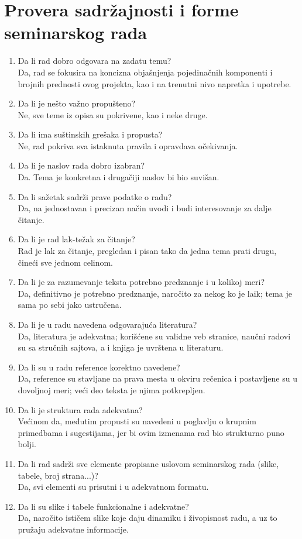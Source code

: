 \documentclass[a4paper]{report}
\begin{document}
	\section{Provera sadržajnosti i forme seminarskog rada}
	
	\begin{enumerate}
		\item Da li rad dobro odgovara na zadatu temu?\\
		Da, rad se fokusira na koncizna objašnjenja pojedinačnih komponenti i brojnih prednosti ovog projekta, kao i na trenutni nivo napretka i upotrebe.
		\item Da li je nešto važno propušteno?\\
		Ne, sve teme iz opisa su pokrivene, kao i neke druge.
		\item Da li ima suštinskih grešaka i propusta?\\
		Ne, rad pokriva sva istaknuta pravila i opravdava očekivanja.
		\item Da li je naslov rada dobro izabran?\\
		Da. Tema je konkretna i drugačiji naslov bi bio suvišan.
		\item Da li sažetak sadrži prave podatke o radu?\\
		Da, na jednostavan i precizan način uvodi i budi interesovanje za dalje čitanje.
		\item Da li je rad lak-težak za čitanje?\\
		Rad je lak za čitanje, pregledan i pisan tako da jedna tema prati drugu, čineći sve jednom celinom. 
		\item Da li je za razumevanje teksta potrebno predznanje i u kolikoj meri?\\
		Da, definitivno je potrebno predznanje, naročito za nekog ko je laik; tema je sama po sebi jako ustručena.
		\item Da li je u radu navedena odgovarajuća literatura?\\
		Da, literatura je adekvatna; korišćene su validne veb stranice, naučni radovi su sa stručnih sajtova, a i knjiga je uvrštena u literaturu.
		\item Da li su u radu reference korektno navedene?\\
		Da, reference su stavljane na prava mesta u okviru rečenica i postavljene su u dovoljnoj meri; veći deo teksta je njima potkrepljen. 
		\item Da li je struktura rada adekvatna?\\
		Većinom da, međutim propusti su navedeni u poglavlju o krupnim primedbama i sugestijama, jer bi ovim izmenama rad bio strukturno puno bolji.
		\item Da li rad sadrži sve elemente propisane uslovom seminarskog rada (slike, tabele, broj strana...)?\\
		Da, svi elementi su prisutni i u adekvatnom formatu.
		\item Da li su slike i tabele funkcionalne i adekvatne?\\
		Da, naročito ističem slike koje daju dinamiku i živopisnost radu, a uz to pružaju adekvatne informacije.
	\end{enumerate}
	
\end{document}

